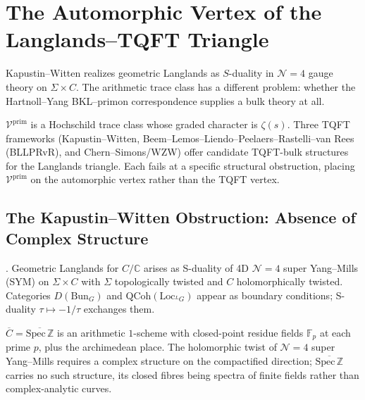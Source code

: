 \chapter{The Automorphic Vertex of the Langlands--TQFT Triangle}
\label{v4-arith:witten}

Kapustin--Witten realizes geometric Langlands as \(S\)-duality in
\(\mathcal N=4\) gauge theory on \(\Sigma\times C\). The arithmetic
trace class has a different problem: whether the Hartnoll--Yang
BKL--primon correspondence supplies a bulk theory at all.

\(\mathcal{V}^{\mathrm{prim}}\) is a Hochschild trace class whose
graded character is \(\zeta(s)\). Three TQFT frameworks (Kapustin--Witten,
Beem--Lemos--Liendo--Peelaers--Rastelli--van Rees (BLLPRvR),
and Chern--Simons/WZW) offer candidate TQFT-bulk structures for the
Langlands triangle. Each fails at a specific structural obstruction,
placing \(\mathcal{V}^{\mathrm{prim}}\) on the automorphic vertex
rather than the TQFT vertex.

\section{The Kapustin--Witten Obstruction: Absence of Complex Structure}
\label{v4-arith:wit:KW-does-not-lift}

\begin{theorem}
\label{v4-arith:thm:KW-setup}
\ClaimStatusProvedElsewhere. Geometric Langlands for \(C/\mathbb{C}\)
arises as S-duality of 4D \(\mathcal{N}=4\) super Yang--Mills (SYM) on \(\Sigma\times C\)
with \(\Sigma\) topologically twisted and \(C\) holomorphically
twisted. Categories \(D(\mathrm{Bun}_{G})\) and
\(\mathrm{QCoh}(\mathrm{Loc}_{^{L}G})\) appear as boundary
conditions; S-duality \(\tau\mapsto-1/\tau\) exchanges them.
\end{theorem}

\begin{observation}
\label{v4-arith:obs:KW-arithmetic-obstruction}
\(\overline{C}=\overline{\mathrm{Spec}\,\mathbb{Z}}\) is an arithmetic
\(1\)-scheme with closed-point residue fields \(\mathbb{F}_{p}\) at each
prime \(p\), plus the archimedean place. The holomorphic twist of
\(\mathcal{N}=4\) super Yang--Mills requires a complex structure on the
compactified direction; \(\overline{\mathrm{Spec}\,\mathbb{Z}}\) carries
no such structure, its closed fibres being spectra of finite fields
rather than complex-analytic curves.
\end{observation}

